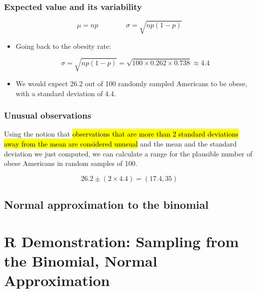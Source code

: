 \documentclass[slidestop,compress,mathserif]{beamer}
\begin{document}

\begin{frame}
\frametitle{Expected value and its variability}

{\[ \mu = np \qquad \qquad \sigma = \sqrt{np(1-p)} \] }

\pause

\begin{itemize}

\item Going back to the obesity rate:

\[ \sigma = \sqrt{np(1-p)} = \sqrt{100 \times 0.262 \times 0.738} \approx  4.4\]

\pause

\item We would expect 26.2 out of 100 randomly sampled Americans to be obese, with a standard deviation of 4.4.

\end{itemize}


\end{frame}


\begin{frame}
\frametitle{Unusual observations}

Using the notion that \hl{observations that are more than 2 standard deviations away from the mean are considered unusual} and the mean and the standard deviation we just computed, we can calculate a range for the plausible number of obese Americans in random samples of 100.

\[ 26.2 \pm (2 \times 4.4) = (17.4, 35) \]

\end{frame}


\subsection{Normal approximation to the binomial}


\section{R Demonstration: Sampling from the Binomial, Normal Approximation}
\end{document}
